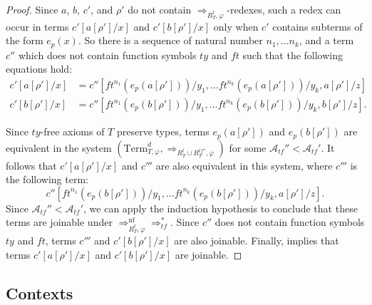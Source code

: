 \documentclass[reqno]{amsart}
\theoremstyle{definition}
\theoremstyle{remark}
\newcommand{\nf}{\mathrm{nf}}
\newcommand{\Term}{\mathrm{Term}}
\newcommand{\ft}{\mathit{ft}}
\newcommand{\ty}{\mathit{ty}}
\numberwithin{figure}{section}
\begin{document}
\begin{proof}
Since $a$, $b$, $c'$, and $\rho'$ do not contain $\Rightarrow_{R_T^t,\varphi}$-redexes, such a redex can occur in terms $c'[a[\rho']/x]$ and $c'[b[\rho']/x]$ only when $c'$ contains subterms of the form $e_p(x)$.
So there is a sequence of natural number $n_1, \ldots n_k$, and a term $c''$ which does not contain function symbols $\ty$ and $\ft$ such that the following equations hold:
\begin{align*}
c'[a[\rho']/x] & = c''[\ft^{n_1}(e_p(a[\rho']))/y_1, \ldots \ft^{n_k}(e_p(a[\rho']))/y_k, a[\rho']/z] \\
c'[b[\rho']/x] & = c''[\ft^{n_1}(e_p(b[\rho']))/y_1, \ldots \ft^{n_k}(e_p(b[\rho']))/y_k, b[\rho']/z].
\end{align*}

Since $\ty$-free axioms of $T$ preserve types, terms $e_p(a[\rho'])$ and $e_p(b[\rho'])$ are equivalent in the system $(\Term_{T,\varphi}^d,\Rightarrow_{R^t_T \cup R^{tf''}_T, \varphi})$ for some $\mathcal{A}_{tf}'' < \mathcal{A}_{tf}'$.
It follows that $c'[a[\rho']/x]$ and $c'''$ are also equivalent in this system, where $c'''$ is the following term:
\[ c''[\ft^{n_1}(e_p(b[\rho']))/y_1, \ldots \ft^{n_k}(e_p(b[\rho']))/y_k, a[\rho']/z]. \]
Since $\mathcal{A}_{tf}'' < \mathcal{A}_{tf}'$, we can apply the induction hypothesis to conclude that these terms are joinable under $\Rightarrow_{R_T^t,\varphi}^\nf \Rightarrow_{tf}^*$.
Since $c''$ does not contain function symbols $\ty$ and $\ft$, terms $c'''$ and $c'[b[\rho']/x]$ are also joinable.
Finally,  implies that terms $c'[a[\rho']/x]$ and $c'[b[\rho']/x]$ are joinable.
\end{proof}

\subsection{Contexts}
\end{document}
